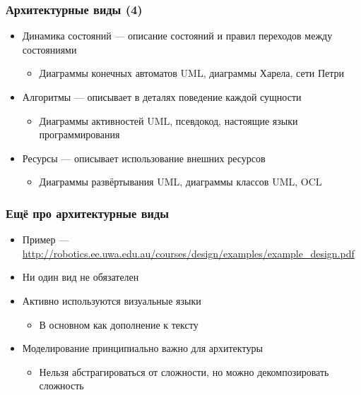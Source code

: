\documentclass[xetex,mathserif,serif]{beamer}
\begin{document}
    \begin{frame}
        \frametitle{Архитектурные виды (4)}
        \begin{itemize}
            \item Динамика состояний --- описание состояний и правил переходов между состояниями
            \begin{itemize}
                \item Диаграммы конечных автоматов UML, диаграммы Харела, сети Петри
            \end{itemize}
            \item Алгоритмы --- описывает в деталях поведение каждой сущности
            \begin{itemize}
                \item Диаграммы активностей UML, псевдокод, настоящие языки программирования
            \end{itemize}
            \item Ресурсы --- описывает использование внешних ресурсов
            \begin{itemize}
                \item Диаграммы развёртывания UML, диаграммы классов UML, OCL
            \end{itemize}
        \end{itemize}
    \end{frame}

    \begin{frame}
        \frametitle{Ещё про архитектурные виды}
        \begin{itemize}
            \item Пример --- \url{http://robotics.ee.uwa.edu.au/courses/design/examples/example_design.pdf}
            \item Ни один вид не обязателен
            \item Активно используются визуальные языки
            \begin{itemize}
                \item В основном как дополнение к тексту
            \end{itemize}
            \item Моделирование принципиально важно для архитектуры
            \begin{itemize}
                \item Нельзя абстрагироваться от сложности, но можно декомпозировать сложность
            \end{itemize}
        \end{itemize}
    \end{frame}
\end{document}

